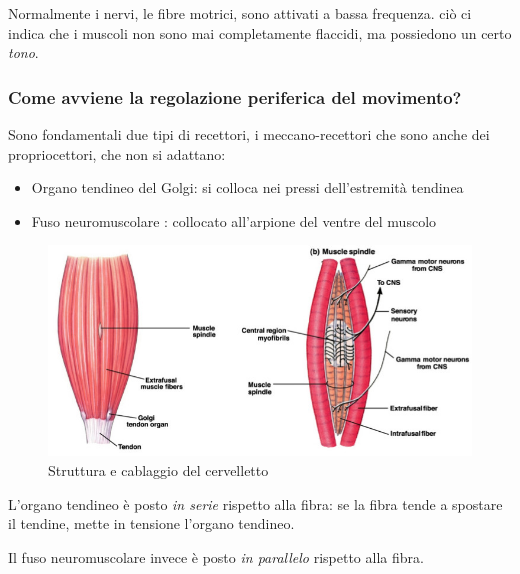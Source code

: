 \documentclass[a4paper,12pt]{article}
\begin{document}
Normalmente i nervi, le fibre motrici, sono attivati a bassa frequenza. ciò ci indica che i muscoli non sono mai completamente flaccidi, ma possiedono un certo \emph{tono}.

\subsubsection{Come avviene la regolazione periferica del movimento?}

Sono fondamentali due tipi di recettori, i meccano-recettori che sono anche dei propriocettori, che non si adattano:
\begin{itemize}
\item{Organo tendineo del Golgi: si colloca nei pressi dell'estremità tendinea}
\item{Fuso neuromuscolare : collocato all'arpione del ventre del muscolo}
\end{itemize}

\begin{figure}[H]
\centering
\includegraphics[scale=0.4]{immagine/propriocettori.jpg}
\caption{Struttura e cablaggio del cervelletto}
\end{figure}

L'organo tendineo è posto \emph{in serie} rispetto alla fibra: se la fibra tende a spostare il tendine, mette in tensione l'organo tendineo.

Il fuso neuromuscolare invece è posto \emph{in parallelo} rispetto alla fibra.
\end{document}
